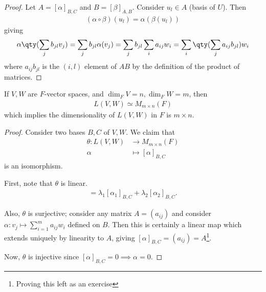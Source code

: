     \begin{proof}
        Let $A = [\alpha]_{B, C}$ and $B = [\beta]_{A, B}$.
        Consider $u_l \in A$ (basis of $U$).
        Then
        \begin{align*}
            (\alpha \circ \beta)(u_l) = \alpha(\beta(u_l))
        \end{align*}
        giving
        \begin{align*}
            \alpha\qty(\sum_j b_{jl} v_j) = \sum_j b_{jl} \alpha(v_j) = \sum_j b_{jl} \sum_i a_{ij} w_i = \sum_i \qty( \sum_j a_{ij} b_{jl} ) w_i
        \end{align*}
        where $a_{ij} b_{jl}$ is the $(i, l)$ element of $AB$ by the definition of the product of matrices.
    \end{proof}
    \begin{proposition} \label{prp:dimmapspace}
        If $V, W$ are $F$-vector spaces, and $\dim_F V = n, \dim_F W = m$, then
        \begin{align*}
            L(V,W) \simeq M_{m \times n}(F)
        \end{align*}
        which implies the dimensionality of $L(V,W)$ in $F$ is $m \times n$.
    \end{proposition}
    \begin{proof}
        Consider two bases $B, C$ of $V, W$.
        We claim that
        \begin{align*}
            \theta \colon L(V,W) &\to M_{m \times n}(F) \\
            \alpha &\mapsto [\alpha]_{B, C}
        \end{align*}
        is an isomorphism.

        First, note that $\theta$ is linear.
        \begin{align*}
            [\lambda_1 \alpha_1 + \lambda_2 \alpha_2] = \lambda_1 [\alpha_1]_{B, C} + \lambda_2 [\alpha_2]_{B, C}.
        \end{align*} 

        Also, $\theta$ is surjective; consider any matrix $A = (a_{ij})$ and consider $\alpha \colon v_j \mapsto \sum_{i=1}^m a_{ij} w_i$ defined on $B$.
        Then this is certainly a linear map which extends uniquely by linearity to $A$, giving $[\alpha]_{B,C} = (a_{ij}) = A$\footnote{Proving this left as an exercise}.

        Now, $\theta$ is injective since $[\alpha]_{B,C} = 0 \implies \alpha = 0$.
    \end{proof}
